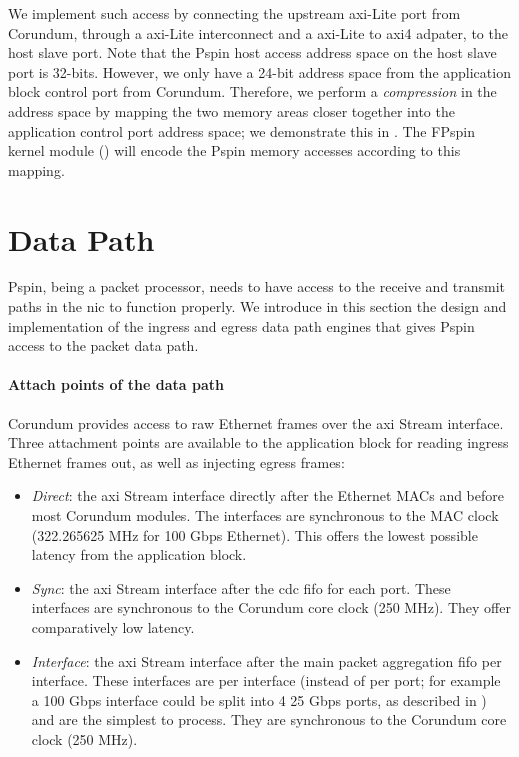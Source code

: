 We implement such access by connecting the upstream \ac{axi}-Lite port from Corundum, through a \ac{axi}-Lite interconnect and a \ac{axi}-Lite to \ac{axi}4 adpater, to the host slave port.  Note that the P\acs{spin} host access address space on the host slave port is 32-bits.  However, we only have a 24-bit address space from the application block control port from Corundum.  Therefore, we perform a \emph{compression} in the address space by mapping the two memory areas closer together into the application control port address space; we demonstrate this in .  The FP\acs{spin} kernel module () will encode the P\acs{spin} memory accesses according to this mapping.

\section{Data Path}

P\acs{spin}, being a packet processor, needs to have access to the receive and transmit paths in the \ac{nic} to function properly.  We introduce in this section the design and implementation of the ingress and egress data path engines that gives P\acs{spin} access to the packet data path.

\paragraph{Attach points of the data path} Corundum provides access to raw Ethernet frames over the \ac{axi} Stream interface.  Three attachment points are available to the application block for reading ingress Ethernet frames out, as well as injecting egress frames:

\begin{itemize}
    \item \emph{Direct}: the \ac{axi} Stream interface directly after the Ethernet MACs and before most Corundum modules.  The interfaces are synchronous to the MAC clock (322.265625 MHz for 100 Gbps Ethernet).  This offers the lowest possible latency from the application block.
    \item \emph{Sync}: the \ac{axi} Stream interface after the \ac{cdc} \ac{fifo} for each port.  These interfaces are synchronous to the Corundum core clock (250 MHz).  They offer comparatively low latency.
    \item \emph{Interface}: the \ac{axi} Stream interface after the main packet aggregation \ac{fifo} per interface.  These interfaces are per interface (instead of per port; for example a 100 Gbps interface could be split into 4 25 Gbps ports, as described in ) and are the simplest to process.  They are synchronous to the Corundum core clock (250 MHz).
\end{itemize}

